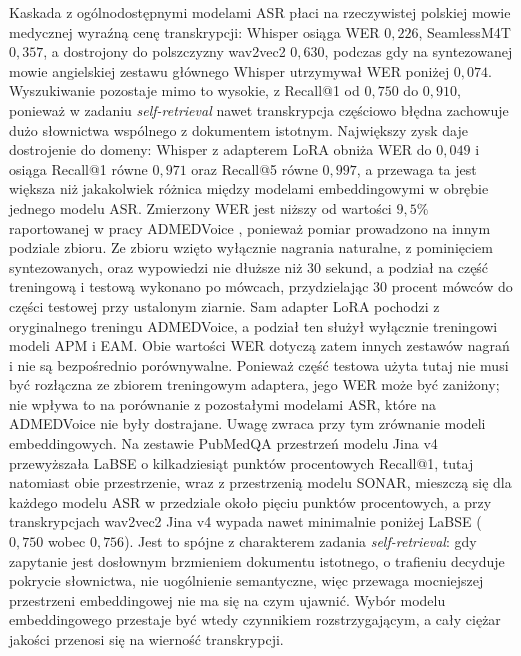 Kaskada z ogólnodostępnymi modelami ASR płaci na rzeczywistej polskiej mowie medycznej wyraźną
cenę transkrypcji: Whisper osiąga WER $0{,}226$, SeamlessM4T $0{,}357$, a dostrojony do
polszczyzny wav2vec2 $0{,}630$, podczas gdy na syntezowanej mowie angielskiej zestawu głównego
Whisper utrzymywał WER poniżej $0{,}074$. Wyszukiwanie pozostaje mimo to wysokie, z Recall@1
od $0{,}750$ do $0{,}910$, ponieważ w zadaniu \textit{self-retrieval} nawet transkrypcja
częściowo błędna zachowuje dużo słownictwa wspólnego z dokumentem istotnym. Największy zysk
daje dostrojenie do domeny: Whisper z adapterem LoRA obniża WER do $0{,}049$ i osiąga Recall@1
równe $0{,}971$ oraz Recall@5 równe $0{,}997$, a przewaga ta jest większa niż jakakolwiek
różnica między modelami embeddingowymi w obrębie jednego modelu ASR. Zmierzony WER jest niższy
od wartości $9{,}5\%$ raportowanej w pracy ADMEDVoice \cite{ADMEDVoice}, ponieważ pomiar
prowadzono na innym podziale zbioru. Ze zbioru wzięto wyłącznie nagrania naturalne, z pominięciem
syntezowanych, oraz wypowiedzi nie dłuższe niż 30 sekund, a podział na część treningową
i testową wykonano po mówcach, przydzielając 30 procent mówców do części testowej przy ustalonym
ziarnie. Sam adapter LoRA pochodzi z oryginalnego treningu ADMEDVoice, a podział ten służył
wyłącznie treningowi modeli APM i EAM. Obie wartości WER dotyczą zatem innych zestawów nagrań
i nie są bezpośrednio porównywalne. Ponieważ część testowa użyta tutaj nie musi być rozłączna
ze zbiorem treningowym adaptera, jego WER może być zaniżony; nie wpływa to na porównanie
z pozostałymi modelami ASR, które na ADMEDVoice nie były dostrajane.
Uwagę zwraca przy tym zrównanie modeli embeddingowych. Na zestawie PubMedQA przestrzeń modelu
Jina v4 przewyższała LaBSE o kilkadziesiąt punktów procentowych Recall@1, tutaj natomiast obie
przestrzenie, wraz z przestrzenią modelu SONAR, mieszczą się dla każdego modelu ASR
w przedziale około pięciu punktów procentowych, a przy transkrypcjach wav2vec2 Jina v4 wypada
nawet minimalnie poniżej LaBSE ($0{,}750$ wobec $0{,}756$). Jest to spójne z charakterem
zadania \textit{self-retrieval}: gdy zapytanie jest dosłownym brzmieniem dokumentu istotnego,
o trafieniu decyduje pokrycie słownictwa, nie uogólnienie semantyczne, więc przewaga
mocniejszej przestrzeni embeddingowej nie ma się na czym ujawnić. Wybór modelu embeddingowego
przestaje być wtedy czynnikiem rozstrzygającym, a cały ciężar jakości przenosi się na wierność
transkrypcji.

